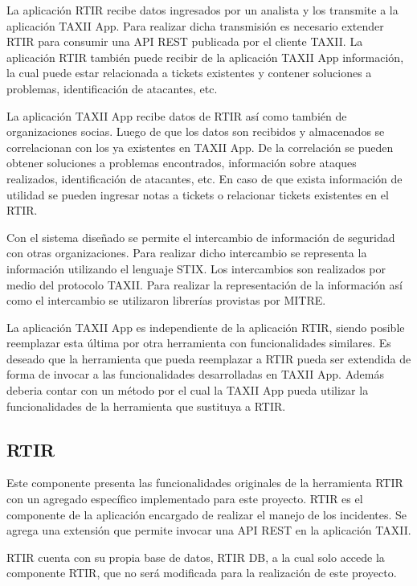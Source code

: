 	La aplicación RTIR recibe datos ingresados por un analista y los transmite a la aplicación
		TAXII App. Para realizar dicha transmisión es necesario extender RTIR para consumir una API REST publicada por el
		cliente TAXII. La aplicación RTIR también puede recibir de la aplicación TAXII App información, la cual puede
		estar relacionada a tickets existentes y contener soluciones a problemas, identificación de atacantes, etc.
	
	
	\bigskip
	
	La aplicación TAXII App recibe datos de RTIR así como también de organizaciones socias. Luego de que los datos son recibidos y almacenados se correlacionan con los ya existentes en TAXII App. De la
		correlación se pueden obtener soluciones a problemas encontrados, información sobre ataques realizados, identificación
		de atacantes, etc. En caso de que exista información de utilidad se pueden ingresar notas a tickets o relacionar
		tickets existentes en el RTIR.\\
		\bigskip

	Con el sistema diseñado se permite el intercambio de información de seguridad con otras organizaciones. Para realizar dicho intercambio se representa la información utilizando el lenguaje STIX. Los intercambios son realizados por medio del protocolo TAXII. Para realizar la representación de la información así como el intercambio se utilizaron librerías provistas por MITRE. 
	
	\bigskip
	
	La aplicación TAXII App es independiente de la aplicación RTIR, siendo posible reemplazar esta
		última por otra herramienta con funcionalidades similares. Es deseado que la herramienta que pueda reemplazar a RTIR
		pueda ser extendida de forma de invocar a las funcionalidades desarrolladas en TAXII App. Además deberia contar con un método por el
		cual la TAXII App pueda utilizar la funcionalidades de la herramienta que sustituya a RTIR.
	
	\subsection{RTIR}
	Este componente presenta las funcionalidades originales de la herramienta RTIR con un agregado
		específico implementado para este proyecto. RTIR es el componente de la aplicación encargado de realizar el manejo de
		los incidentes. Se agrega una extensión que permite invocar una API REST en la aplicación TAXII.
	\bigskip
	
	RTIR cuenta con su propia base de datos, RTIR DB, a la cual solo accede la componente RTIR, que no será modificada para la realización de este proyecto.
	
